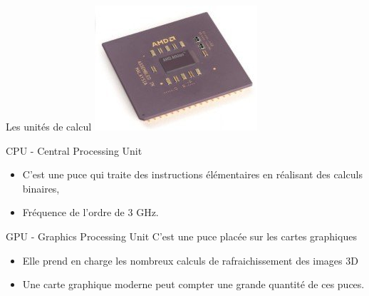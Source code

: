 \begin{frame}{Les unités de calcul}
  \center \includegraphics[height = 3 cm]{img/s01/CPU.png}
  \begin{block}{CPU - Central Processing Unit}
    \begin{itemize}
    \item C'est une puce qui traite des instructions élémentaires en
      réalisant des calculs binaires,
    \item Fréquence de l'ordre de 3 GHz.
    \end{itemize}
  \end{block}
  \begin{block}{GPU - Graphics Processing Unit}
    C'est une puce placée sur les cartes graphiques
    \begin{itemize}
    \item Elle prend en charge les nombreux calculs de rafraichissement
      des images 3D
    \item Une carte graphique moderne peut compter une grande quantité
      de ces puces.
    \end{itemize}
  \end{block}
\end{frame}

